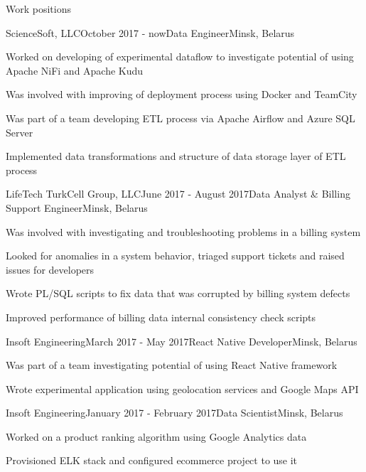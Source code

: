 \documentclass{resume} %
\begin{document}

\begin{rSection}{Work positions}

\begin{rSubsection}{ScienceSoft, LLC}{October 2017 - now}{Data Engineer}{Minsk, Belarus}
\item Worked on developing of experimental dataflow to investigate potential of using Apache NiFi and Apache Kudu
\item Was involved with improving of deployment process using Docker and TeamCity
\item Was part of a team developing ETL process via Apache Airflow and Azure SQL Server
\item Implemented data transformations and structure of data storage layer of ETL process
\end{rSubsection}

\begin{rSubsection}{LifeTech TurkCell Group, LLC}{June 2017 - August 2017}{Data Analyst \& Billing Support Engineer}{Minsk, Belarus}
\item Was involved with investigating and troubleshooting problems in a billing system
\item Looked for anomalies in a system behavior, triaged support tickets and raised issues for developers
\item Wrote PL/SQL scripts to fix data that was corrupted by billing system defects
\item Improved performance of billing data internal consistency check scripts
\end{rSubsection}

\begin{rSubsection}{Insoft Engineering}{March 2017 - May 2017}{React Native Developer}{Minsk, Belarus}
\item Was part of a team investigating potential of using React Native framework
\item Wrote experimental application using geolocation services and Google Maps API
\end{rSubsection}

\begin{rSubsection}{Insoft Engineering}{January 2017 - February 2017}{Data Scientist}{Minsk, Belarus}
\item Worked on a product ranking algorithm using Google Analytics data
\item Provisioned ELK stack and configured ecommerce project to use it
\end{rSubsection}


\end{rSection}
\end{document}
